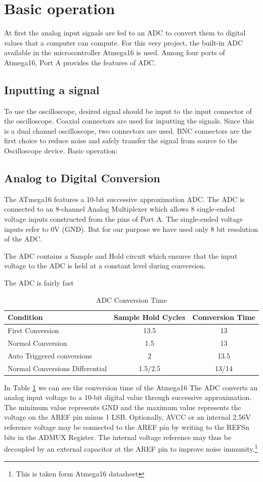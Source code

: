 \documentclass[12pt,a4paper]{article}
\begin{document}
\section{Basic operation}
At first the analog input signals are fed to an ADC to convert them to digital values that a computer can compute. For this very project, the built-in ADC available in the microcontroller Atmega16 is used. Among four ports of Atmega16, Port A provides the features of ADC.

\subsection{Inputting a signal}

To use the oscilloscope, desired signal should be input  to the input connector of the oscilloscope. Coaxial connectors are used for inputting the signals. Since this is a dual channel oscilloscope, two connectors are used. BNC connectors are the first choice to reduce noise and safely transfer the signal from source to the Oscilloscope device.
Basic operation: 


\subsection{Analog to Digital Conversion}
The ATmega16 features a 10-bit successive approximation ADC. The ADC is connected to an
8-channel Analog Multiplexer which allows 8 single-ended voltage inputs constructed from the
pins of Port A. The single-ended voltage inputs refer to 0V (GND). But for our purpose we have used only 8 bit resolution of the ADC.

The ADC contains a Sample and Hold circuit which ensures that the input voltage to the ADC is
held at a constant level during conversion.

The ADC is fairly fast  
\begin{table}[ht]
	\centering
	\begin{tabular}{|l|c|c|}
		\hline 
		Condition & Sample Hold Cycles & Comversion Time \\ 
		\hline 
		First Conversion & 13.5 & 13 \\ 
		\hline 
		Normol Conversion & 1.5 & 13 \\ 
		\hline 
		Auto Triggered conversions & 2 & 13.5 \\ 
		\hline 
		Normal Conversions Differential & 1.5/2.5 & 13/14 \\ 
		\hline 
	\end{tabular}
	
	\caption{ADC Conversion Time} 
	\label{tab:ADCCnvTime}
\end{table}
In Table \ref{tab:ADCCnvTime} we can see the conversion time of the Atmega16
The ADC converts an analog input voltage to a 10-bit digital value through successive approximation. The minimum value represents GND and the maximum value represents the voltage on the AREF pin minus 1 LSB. Optionally, AVCC or an internal 2.56V reference voltage may be connected to the AREF pin by writing to the REFSn bits in the ADMUX Register. The internal voltage reference may thus be decoupled by an external capacitor at the AREF pin to improve noise immunity.\footnote{This is taken form Atmega16 datasheet}
\end{document}
